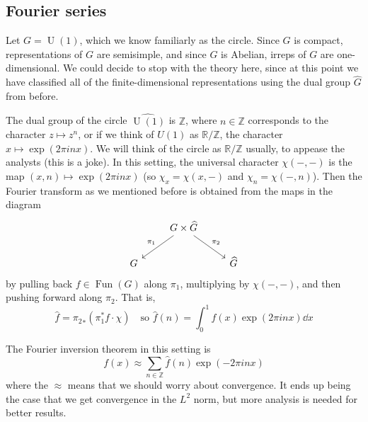 \documentclass[11pt,leqno]{article}
\theoremstyle{plain}
\theoremstyle{definition}
\numberwithin{equation}{section}
\numberwithin{lem}{section}
\DeclareMathOperator{\Fun}{Fun}
\DeclareMathOperator{\U}{U}
\begin{document}
\subsection{Fourier series}
Let $G = \U(1)$, which we know familiarly as the circle. Since $G$ is compact, representations of $G$ are semisimple, and since $G$ is Abelian, irreps of $G$ are one-dimensional. We could decide to stop with the theory here, since at this point we have classified all of the finite-dimensional representations using the dual group $\widehat G$ from before.

The dual group of the circle $\widehat{\U(1)}$ is $\mathbb Z$, where $n\in\mathbb Z$ corresponds to the character $z\mapsto z^n$, or if we think of $U(1)$ as $\mathbb R/\mathbb Z$, the character $x\mapsto \exp(2\pi inx)$. We will think of the circle as $\mathbb R/\mathbb Z$ usually, to appease the analysts (this is a joke). In this setting, the universal character $\chi(-,-)$ is the map $(x,n)\mapsto \exp(2\pi i nx )$ (so $\chi_x = \chi(x,-)$ and $\chi_n = \chi(-,n)$). Then the Fourier transform as we mentioned before is obtained from the maps in the diagram 
\[\begin{tikzcd}
	& {G\times \widehat G} \\
	G && {\widehat G}
	\arrow["{\pi_1}"', from=1-2, to=2-1]
	\arrow["{\pi_2}", from=1-2, to=2-3]
\end{tikzcd}\]
by pulling back $f\in \Fun(G)$ along $\pi_1$, multiplying by $\chi(-,-)$, and then pushing forward along $\pi_2$. That is, 
\[\hat f = {\pi_2}_\ast(\pi_1^\ast f\cdot \chi)\quad\text{so }\hat f(n) = \int_0^1 f(x)\exp(2\pi inx)\dd x\]

The Fourier inversion theorem in this setting is
\[f(x) \approx \sum_{n\in\mathbb Z}\hat f(n)\exp(-2\pi i nx)\]
where the $\approx$ means that we should worry about convergence. It ends up being the case that we get convergence in the $L^2$ norm, but more analysis is needed for better results.
\end{document}
